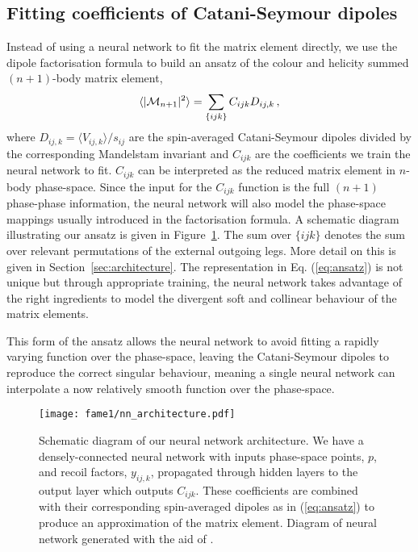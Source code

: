 \documentclass[main.tex]{subfiles}
\begin{document}
\subsection{Fitting coefficients of Catani-Seymour dipoles}\label{sec:ansatz}
Instead of using a neural network to fit the matrix element directly, we use the dipole factorisation formula to build an ansatz of the colour and helicity summed $(n+1)$-body matrix element,
\begin{eqnarray}\label{eq:ansatz}
    \langle | \mathcal{M}_{n+1}|^{2} \rangle = \sum_{\{ijk\}} C_{ijk} D_{ij,k} \, ,
\end{eqnarray}
where $D_{ij,k} = \langle V_{ij,k} \rangle / s_{ij}$ are the spin-averaged Catani-Seymour dipoles divided by the corresponding Mandelstam invariant and $C_{ijk}$ are the coefficients we train the neural network to fit.
$C_{ijk}$ can be interpreted as the reduced matrix element in $n$-body phase-space. 
Since the input for the $C_{ijk}$ function is the full $(n+1)$ phase-phase information, the neural network will also model the phase-space mappings usually introduced in the factorisation formula.
A schematic diagram illustrating our ansatz is given in Figure~\ref{fig:nn_architecture}.
The sum over ${\{ijk\}}$ denotes the sum over relevant permutations of the external outgoing legs.
More detail on this is given in Section~\ref{sec:architecture}.
The representation in Eq. (\ref{eq:ansatz}) is not unique but 
through appropriate training, the neural network takes advantage of the right ingredients to model 
the divergent soft and collinear behaviour of the matrix elements.

This form of the ansatz allows the neural network to avoid fitting a rapidly varying function over the phase-space, leaving the Catani-Seymour dipoles to reproduce the correct singular behaviour, meaning a single neural network can interpolate a now relatively smooth function over the phase-space.

\begin{figure}
    \texttt{[image: fame1/nn\_architecture.pdf]}
    \caption{Schematic diagram of our neural network architecture.
    We have a densely-connected neural network with inputs phase-space points, $p$, and recoil factors, $y_{ij,k}$, propagated through hidden layers to the output layer which outputs $C_{ijk}$.
    These coefficients are combined with their corresponding spin-averaged dipoles as in (\ref{eq:ansatz}) to produce an approximation of the matrix element.
    Diagram of neural network generated with the aid of \cite{LeNail2019}.}
    \label{fig:nn_architecture}
\end{figure}
\end{document}
